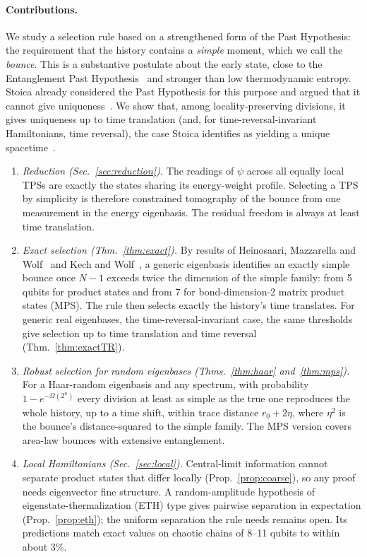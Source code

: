 \documentclass[11pt]{article}
\theoremstyle{definition}
\theoremstyle{remark}
\begin{document}
\paragraph{Contributions.} We study a selection rule based on a strengthened form of the Past Hypothesis: the requirement that the history contains a \emph{simple} moment, which we call the \emph{bounce}. This is a substantive postulate about the early state, close to the Entanglement Past Hypothesis~\cite{AlKhaliliChen2024} and stronger than low thermodynamic entropy. Stoica already considered the Past Hypothesis for this purpose and argued that it cannot give uniqueness~\cite[Sec.~VII.B]{Stoica2022}. We show that, among locality-preserving divisions, it gives uniqueness up to time translation (and, for time-reversal-invariant Hamiltonians, time reversal), the case Stoica identifies as yielding a unique spacetime~\cite[Remark~10 and Sec.~VII.E]{Stoica2022}.
\begin{enumerate}
\item \emph{Reduction (Sec.~\ref{sec:reduction}).} The readings of $\psi$ across all equally local TPSs are exactly the states sharing its energy-weight profile. Selecting a TPS by simplicity is therefore constrained tomography of the bounce from one measurement in the energy eigenbasis. The residual freedom is always at least time translation.
\item \emph{Exact selection (Thm.~\ref{thm:exact}).} By results of Heinosaari, Mazzarella and Wolf~\cite{HMW2013} and Kech and Wolf~\cite{KechWolf2017}, a generic eigenbasis identifies an exactly simple bounce once $N-1$ exceeds twice the dimension of the simple family: from 5 qubits for product states and from 7 for bond-dimension-2 matrix product states (MPS). The rule then selects exactly the history's time translates. For generic real eigenbases, the time-reversal-invariant case, the same thresholds give selection up to time translation and time reversal (Thm.~\ref{thm:exactTR}).
\item \emph{Robust selection for random eigenbases (Thms.~\ref{thm:haar} and~\ref{thm:mps}).} For a Haar-random eigenbasis and any spectrum, with probability $1-e^{-\Omega(2^n)}$ every division at least as simple as the true one reproduces the whole history, up to a time shift, within trace distance $r_0+2\eta$, where $\eta^2$ is the bounce's distance-squared to the simple family. The MPS version covers area-law bounces with extensive entanglement.
\item \emph{Local Hamiltonians (Sec.~\ref{sec:local}).} Central-limit information cannot separate product states that differ locally (Prop.~\ref{prop:coarse}), so any proof needs eigenvector fine structure. A random-amplitude hypothesis of eigenstate-thermalization (ETH) type gives pairwise separation in expectation (Prop.~\ref{prop:eth}); the uniform separation the rule needs remains open. Its predictions match exact values on chaotic chains of 8--11 qubits to within about 3\%.
\end{enumerate}
\end{document}
